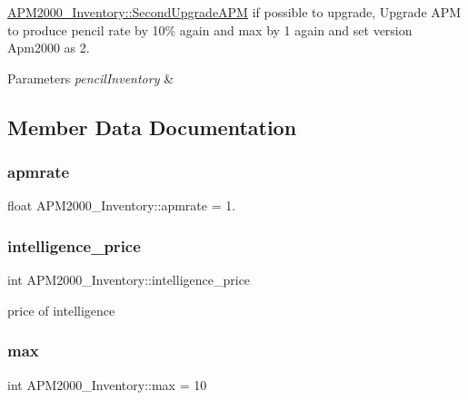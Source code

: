 \mbox{\hyperlink{classAPM2000__Inventory_af6637ca987470d8603bba595b31d7cc0}{A\+P\+M2000\+\_\+\+Inventory\+::\+Second\+Upgrade\+A\+PM}} if possible to upgrade, Upgrade A\+PM to produce pencil rate by 10\% again and max by 1 again and set version Apm2000 as 2. 


\begin{DoxyParams}{Parameters}
{\em pencil\+Inventory} & \\
\hline
\end{DoxyParams}


\subsection{Member Data Documentation}
\mbox{\label{classAPM2000__Inventory_a51778099d3b5f24cffbef6a67861f686}} 
\subsubsection{\texorpdfstring{apmrate}{apmrate}}
{\footnotesize\ttfamily float A\+P\+M2000\+\_\+\+Inventory\+::apmrate = 1.\hspace{0.3cm}{\ttfamily [private]}}

\mbox{\label{classAPM2000__Inventory_ad28d9181ef8ef98da5af0c6faca0baba}} 
\subsubsection{\texorpdfstring{intelligence\_price}{intelligence\_price}}
{\footnotesize\ttfamily int A\+P\+M2000\+\_\+\+Inventory\+::intelligence\+\_\+price\hspace{0.3cm}{\ttfamily [private]}}



price of intelligence 

\mbox{\label{classAPM2000__Inventory_af325ac7f920a0ab954621b6f44121bc2}} 
\subsubsection{\texorpdfstring{max}{max}}
{\footnotesize\ttfamily int A\+P\+M2000\+\_\+\+Inventory\+::max = 10\hspace{0.3cm}{\ttfamily [private]}}



